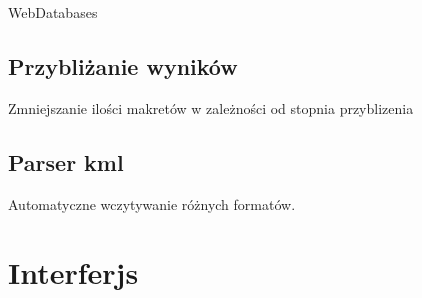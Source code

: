WebDatabases 

\subsection{Przybliżanie wyników}
\label{subsec:przyblizanie}

Zmniejszanie ilości makretów w zależności od stopnia przyblizenia


\subsection{Parser kml}
\label{subsec:scaner}

Automatyczne wczytywanie różnych formatów.




\section{Interferjs}
\label{sec:Interferjs}


